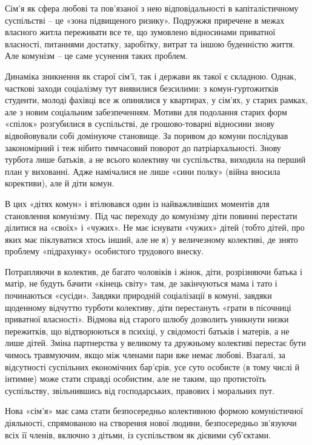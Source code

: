 \documentclass[12pt,a4paper,openany]{book}
\begin{document}
Сім’я як сфера любові та пов’язаної з нею відповідальності в капіталістичному суспільстві – це «зона підвищеного ризику». Подружжя приречене в межах власного житла переживати все те, що зумовлено відносинами приватної власності, питаннями достатку, заробітку, витрат та іншою буденністю життя. Але комунізм – це саме усунення таких проблем.

Динаміка зникнення як старої сім’ї, так і держави як такої є складною. Однак, часткові заходи соціалізму тут виявилися безсилими: з комун-гуртожитків студенти, молоді фахівці все ж опинялися у квартирах, у сім’ях, у старих рамках, але з новим соціальним забезпеченням. Мотиви для подолання старих форм «спілок» розгубилися в суспільстві, де грошово-товарні відносини знову відвойовували собі домінуюче становище. За поривом до комуни послідував закономірний і теж нібито тимчасовий поворот до патріархальності. Знову турбота лише батьків, а не всього колективу чи суспільства, виходила на перший план у вихованні. Адже намічалися не лише «сини полку» (війна вносила корективи), але й діти комун.

В цих «дітях комун» і втілювався один із найважливіших моментів для становлення комунізму. Під час переходу до комунізму діти повинні перестати ділитися на «своїх» і «чужих». Не має існувати «чужих» дітей (тобто дітей, про яких має піклуватися хтось інший, але не я) у величезному колективі, де знято проблему «підрахунку» особистого трудового внеску.

Потрапляючи в колектив, де багато чоловіків і жінок, діти, розрізняючи батька і матір, не будуть бачити «кінець світу» там, де закінчуються мама і тато і починаються «сусіди». Завдяки природній соціалізації в комуні, завдяки щоденному відчуттю турботи колективу, діти перестануть «грати в пісочниці приватної власності». Відмова від старого шлюбу дозволить уникнути низки пережитків, що відтворюються в психіці, у свідомості батьків і матерів, а не лише дітей. Зміна партнерства у великому та дружньому колективі перестає бути чимось травмуючим, якщо між членами пари вже немає любові. Взагалі, за відсутності суспільних економічних бар’єрів, усе суто особисте (в тому числі й інтимне) може стати справді особистим, але не таким, що протистоїть суспільству, звільнившись від господарських, правових і моральних пут.

Нова «сім’я» має сама стати безпосередньо колективною формою комуністичної діяльності, спрямованою на створення нової людини, безпосередньо зв’язуючи всіх її членів, включно з дітьми, із суспільством як дієвими суб’єктами.
\ifSubfilesClassLoaded{\setcounter{page}{54}}{}
\end{document}
